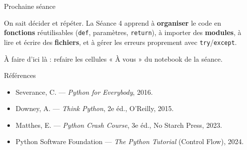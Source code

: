 \documentclass[aspectratio=169,11pt]{beamer}
\begin{document}
\begin{frame}{Prochaine séance}
\begin{ucaddef}
{\small On sait décider et répéter. La Séance 4 apprend à \textbf{organiser} le code en \textbf{fonctions} réutilisables (\texttt{def}, paramètres, \texttt{return}), à importer des \textbf{modules}, à lire et écrire des \textbf{fichiers}, et à gérer les erreurs proprement avec \texttt{try}/\texttt{except}.}
\end{ucaddef}
{\small À faire d'ici là : refaire les cellules « À vous » du notebook de la séance.}
\end{frame}

\begin{frame}{Références}
\begin{itemize}\small
  \item Severance, C. — \emph{Python for Everybody}, 2016.
  \item Downey, A. — \emph{Think Python}, 2e éd., O'Reilly, 2015.
  \item Matthes, E. — \emph{Python Crash Course}, 3e éd., No Starch Press, 2023.
  \item Python Software Foundation — \emph{The Python Tutorial} (Control Flow), 2024.
\end{itemize}
\end{frame}
\end{document}
